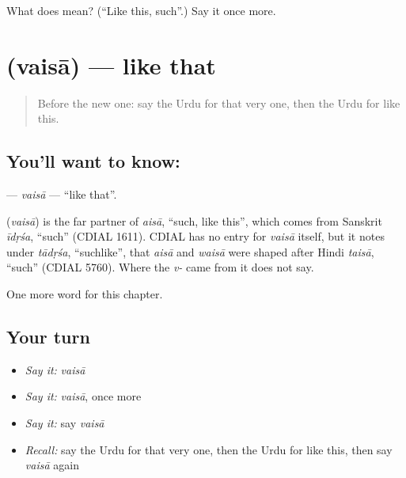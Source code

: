 \begin{tcolorbox}[breakable,colback=teal!4,colframe=teal!35!black,title={Before you move on}]
What does  mean? (\textquotedblleft{}Like this, such\textquotedblright{}.) Say it once more.
\end{tcolorbox}
\section[\texorpdfstring{\ur{ویسا} (vaisā)}{ویسا (vaisā)}]{ (vaisā) — like that}

\label{lesson:UR-C88-vaisa}



\begin{quote}
Before the new one: say the Urdu for that very one, then the Urdu for like this.
\end{quote}

\subsection*{You'll want to know: }
\textbf{} — \emph{vaisā} — \textquotedblleft{}like that\textquotedblright{}.

\begin{cousinweb}
\textbf{} (\emph{vaisā}) is the far partner of \emph{aisā}, \textquotedblleft{}such, like this\textquotedblright{}, which comes from Sanskrit \emph{īdṛśa}, \textquotedblleft{}such\textquotedblright{} (CDIAL 1611). CDIAL has no entry for \emph{vaisā} itself, but it notes under \emph{tādṛśa}, \textquotedblleft{}suchlike\textquotedblright{}, that \emph{aisā} and \emph{waisā} were shaped after Hindi \emph{taisā}, \textquotedblleft{}such\textquotedblright{} (CDIAL 5760). Where the \emph{v-} came from it does not say.
\end{cousinweb}

\begin{grammarlens}[title={What you've built}]
One more word for this chapter.
\end{grammarlens}

\subsection*{Your turn}
\begin{itemize}
\raggedright
  \item \emph{Say it:} \emph{vaisā}
  \item \emph{Say it:} \emph{vaisā}, once more
  \item \emph{Say it:} say \emph{vaisā}
  \item \emph{Recall:} say the Urdu for that very one, then the Urdu for like this, then say \emph{vaisā} again
\end{itemize}

